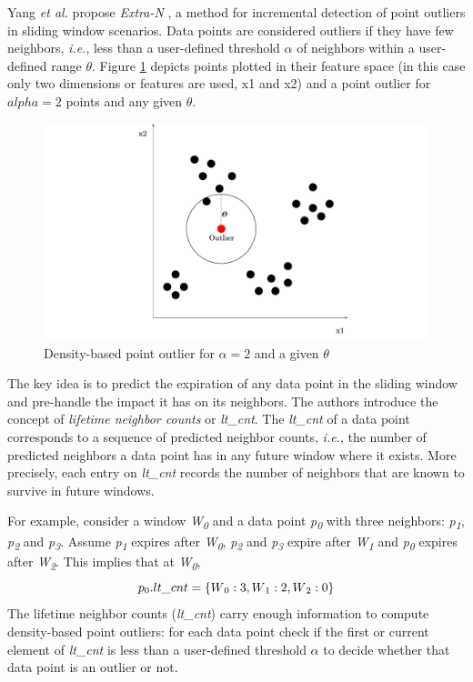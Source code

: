 Yang \emph{et al.} propose \emph{Extra-N} \cite{Yang-Neighbor-Based-Pattern-Detection}, a method for incremental detection of point outliers in sliding window scenarios. Data points are considered outliers if they have few neighbors, \textit{i.e.}, less than a user-defined threshold $\alpha$ of neighbors within a user-defined range $\theta$. Figure \ref{fig:point-outlier} depicts points plotted in their feature space (in this case only two dimensions or features are used, x1 and x2) and a point outlier for $alpha=2$ points and any given $\theta$.
\begin{figure}[!htb]
  \begin{center}
    \includegraphics[scale=0.6]{figures/point-outlier.pdf}
    \caption[Density-based point outlier]{Density-based point outlier for $\alpha=2$ and a given $\theta$}
    \label{fig:point-outlier}
  \end{center}
\end{figure}

The key idea is to predict the expiration of any data point in the sliding window and pre-handle the impact it has on its neighbors. The authors introduce the concept of \emph{lifetime neighbor counts} or \textit{lt\_cnt}. The \textit{lt\_cnt} of a data point corresponds to a sequence of predicted neighbor counts, \textit{i.e.}, the number of predicted neighbors a data point has in any future window where it exists. More precisely, each entry on \textit{lt\_cnt} records the number of neighbors that are known to survive in future windows. 

For example, consider a window \textit{W\textsubscript{0}} and a data point \textit{p\textsubscript{0}} with three neighbors: \textit{p\textsubscript{1}}, \textit{p\textsubscript{2}} and \textit{p\textsubscript{3}}. Assume \textit{p\textsubscript{1}} expires after \textit{W\textsubscript{0}}, \textit{p\textsubscript{2}} and \textit{p\textsubscript{3}} expire after \textit{W\textsubscript{1}} and \textit{p\textsubscript{0}} expires after \textit{W\textsubscript{2}}. This implies that at \textit{W\textsubscript{0}}, 
\[ p\textsubscript{0}.lt\_cnt = \{W\textsubscript{0}: 3, W\textsubscript{1}: 2, W\textsubscript{2}: 0\} \]
The lifetime neighbor counts (\textit{lt\_cnt}) carry enough information to compute density-based point outliers: for each data point check if the first or current element of \textit{lt\_cnt} is less than a user-defined threshold $\alpha$ to decide whether that data point is an outlier or not.


